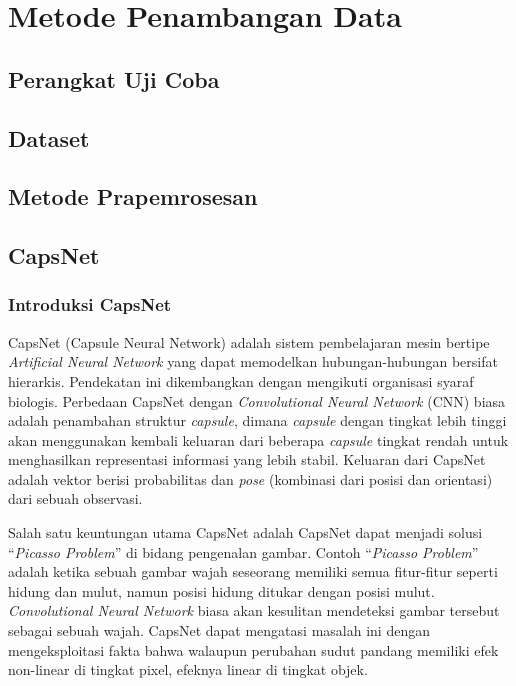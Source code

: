\documentclass{article}
\begin{document}
   \section{Metode Penambangan Data}
    \subsection{Perangkat Uji Coba}
    \subsection{Dataset}
    \subsection{Metode Prapemrosesan}
    \subsection{CapsNet}
	   	\subsubsection{Introduksi CapsNet}
	   	CapsNet (Capsule Neural Network) adalah sistem pembelajaran mesin bertipe \textit{Artificial Neural Network} yang dapat memodelkan hubungan-hubungan bersifat hierarkis. Pendekatan ini dikembangkan dengan mengikuti organisasi syaraf biologis. Perbedaan CapsNet dengan \textit{Convolutional Neural Network} (CNN) biasa adalah penambahan struktur \textit{capsule}, dimana \textit{capsule} dengan tingkat lebih tinggi akan menggunakan kembali keluaran dari beberapa \textit{capsule} tingkat rendah untuk menghasilkan representasi informasi yang lebih stabil. Keluaran dari CapsNet adalah vektor berisi probabilitas dan \textit{pose} (kombinasi dari posisi dan orientasi) dari sebuah observasi. 
	   	\par
	   	Salah satu keuntungan utama CapsNet adalah CapsNet dapat menjadi solusi “\textit{Picasso Problem}” di bidang pengenalan gambar. Contoh “\textit{Picasso Problem}” adalah ketika sebuah gambar wajah seseorang memiliki semua fitur-fitur seperti hidung dan mulut, namun posisi hidung ditukar dengan posisi mulut. \textit{Convolutional Neural Network} biasa akan kesulitan mendeteksi gambar tersebut sebagai sebuah wajah. CapsNet dapat mengatasi masalah ini dengan mengeksploitasi fakta bahwa walaupun perubahan sudut pandang memiliki efek non-linear di tingkat pixel, efeknya linear di tingkat objek.
	   	
\end{document}
